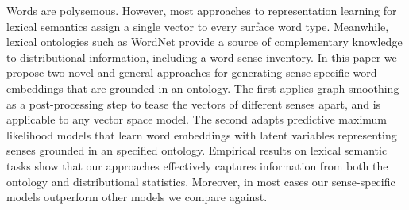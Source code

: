 Words are polysemous. However, most approaches to representation learning for lexical semantics assign a single vector to every surface word type. Meanwhile, lexical ontologies such as WordNet provide a source of complementary knowledge to distributional information, including a word sense inventory. In this paper we propose two novel and general approaches for generating sense-specific word embeddings that are grounded in an ontology. The first applies graph smoothing as a post-processing step to tease the vectors of different senses apart, and is applicable to any vector space model. The second adapts predictive maximum likelihood models that learn word embeddings with latent variables representing senses grounded in an specified ontology. Empirical results on lexical semantic tasks show that our approaches effectively captures information from both the ontology and distributional statistics. Moreover, in most cases our sense-specific models outperform other models we compare against.

